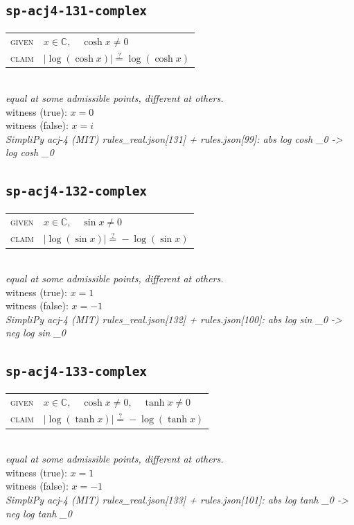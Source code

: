 \documentclass[11pt]{article}
\begin{document}
\subsection*{\texttt{sp-acj4-131-complex}}
\begin{tabular}{@{}l@{\quad}l@{}}
\textsc{given} & $x \in \mathbb{C},\quad \cosh x \neq 0$ \\[4pt]
\textsc{claim} & $\displaystyle \left|\log\left(\cosh x\right)\right| \overset{?}{=} \log\left(\cosh x\right)$ \\
\end{tabular}\\[2pt]
{\small\emph{equal at some admissible points, different at others.}}\\
{\footnotesize\color{gray}witness (true): $x = 0$}\\
{\footnotesize\color{gray}witness (false): $x = i$}\\
\emph{SimpliPy acj-4 (MIT) rules\_real.json[131] + rules.json[99]: abs log cosh \_0  ->  log cosh \_0}\\

\subsection*{\texttt{sp-acj4-132-complex}}
\begin{tabular}{@{}l@{\quad}l@{}}
\textsc{given} & $x \in \mathbb{C},\quad \sin x \neq 0$ \\[4pt]
\textsc{claim} & $\displaystyle \left|\log\left(\sin x\right)\right| \overset{?}{=} -\log\left(\sin x\right)$ \\
\end{tabular}\\[2pt]
{\small\emph{equal at some admissible points, different at others.}}\\
{\footnotesize\color{gray}witness (true): $x = 1$}\\
{\footnotesize\color{gray}witness (false): $x = -1$}\\
\emph{SimpliPy acj-4 (MIT) rules\_real.json[132] + rules.json[100]: abs log sin \_0  ->  neg log sin \_0}\\

\subsection*{\texttt{sp-acj4-133-complex}}
\begin{tabular}{@{}l@{\quad}l@{}}
\textsc{given} & $x \in \mathbb{C},\quad \cosh x \neq 0,\quad \tanh x \neq 0$ \\[4pt]
\textsc{claim} & $\displaystyle \left|\log\left(\tanh x\right)\right| \overset{?}{=} -\log\left(\tanh x\right)$ \\
\end{tabular}\\[2pt]
{\small\emph{equal at some admissible points, different at others.}}\\
{\footnotesize\color{gray}witness (true): $x = 1$}\\
{\footnotesize\color{gray}witness (false): $x = -1$}\\
\emph{SimpliPy acj-4 (MIT) rules\_real.json[133] + rules.json[101]: abs log tanh \_0  ->  neg log tanh \_0}\\
\end{document}
